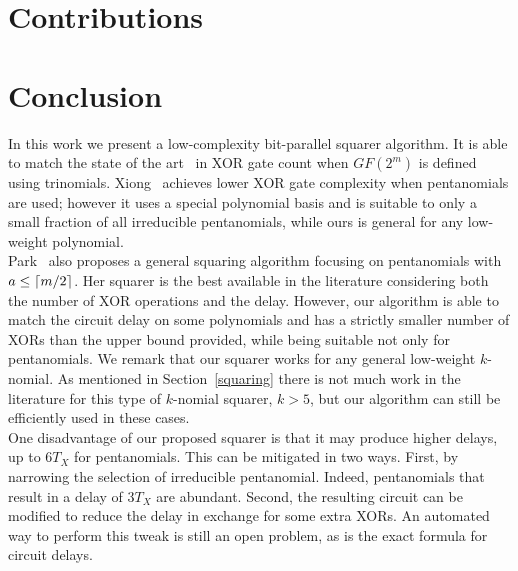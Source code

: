 



\section{Contributions}

\section{Conclusion} \label{conclusion}

In this work we present a low-complexity bit-parallel squarer algorithm. It is able to match the state of the art~\cite{wu2002bit} in XOR gate count when $GF(2^m)$ is defined using trinomials. Xiong~\cite{xiong2014gf} achieves lower XOR gate complexity when pentanomials are used; however it uses a special polynomial basis and is suitable to only a small fraction of all irreducible pentanomials, while ours is general for any low-weight polynomial.\\

Park~\cite{park2012explicit} also proposes a general squaring algorithm focusing on pentanomials with $a \leq \lceil m/2\rceil$. Her squarer is the best available in the literature considering both the number of XOR operations and the delay. However, our algorithm is able to match the circuit delay on some polynomials and has a strictly smaller number of XORs than the upper bound provided, while being suitable not only for pentanomials. 
We remark that our squarer works for any general low-weight $k$-nomial. As mentioned in Section~\ref{squaring} there is not much work in the literature for this type of $k$-nomial squarer, $k>5$, but our algorithm can still be efficiently used in these cases.\\

One disadvantage of our proposed squarer is that it may produce higher delays, up to $6 T_X$ for pentanomials. This can be mitigated in two ways. First, by narrowing the selection of irreducible pentanomial. Indeed,  pentanomials that result in a delay of $3 T_X$ are abundant. Second, the resulting circuit can be modified to reduce the delay in exchange for some extra XORs. An automated way to perform this tweak is still an open problem, as is the exact formula for circuit delays.\\

